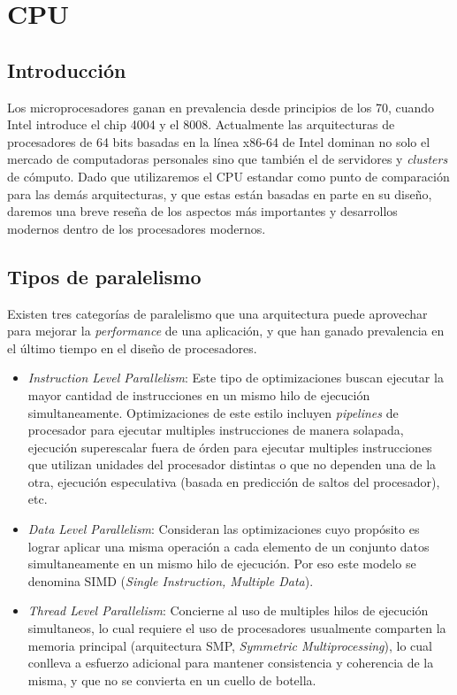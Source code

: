 \section {CPU}

\subsection{Introducci\'on}

Los microprocesadores ganan en prevalencia desde principios de los 70,
cuando Intel introduce el chip 4004 y el 8008. Actualmente las arquitecturas
de procesadores de 64 bits basadas en la l\'inea x86-64 de Intel 
dominan no solo el mercado de computadoras personales sino que tambi\'en el de
servidores y \textit{clusters} de c\'omputo. Dado que utilizaremos el CPU 
estandar como punto de comparaci\'on para las dem\'as arquitecturas, y que estas
est\'an basadas en parte en su dise\~no, daremos una breve rese\~na de los aspectos
m\'as importantes y desarrollos modernos dentro de los procesadores modernos.

\subsection{Tipos de paralelismo}

Existen tres categor\'ias de paralelismo que una arquitectura puede aprovechar 
para mejorar la \textit{performance} de una aplicaci\'on, y que han ganado prevalencia
en el \'ultimo tiempo en el dise\~no de procesadores.

\begin{itemize}
    \item \textit{Instruction Level Parallelism}: Este tipo de optimizaciones buscan
    ejecutar la mayor cantidad de instrucciones en un mismo hilo de ejecuci\'on simultaneamente.
    Optimizaciones de este estilo incluyen
    \textit{pipelines} de procesador para ejecutar multiples instrucciones de manera solapada,
    ejecuci\'on superescalar fuera de \'orden para ejecutar multiples instrucciones que 
    utilizan unidades del procesador distintas o que no dependen una de la otra, ejecuci\'on
    especulativa (basada en predicci\'on de saltos del procesador), etc. 

    \item \textit{Data Level Parallelism}: Consideran las optimizaciones cuyo prop\'osito es
    lograr aplicar una misma operaci\'on a cada elemento de un conjunto datos simultaneamente 
    en un mismo hilo de ejecuci\'on.  Por eso este modelo se denomina SIMD
    (\textit{Single Instruction, Multiple Data}).

    \item \textit{Thread Level Parallelism}: Concierne al uso de multiples hilos de ejecuci\'on
    simultaneos, lo cual requiere el uso de procesadores usualmente
    comparten la memoria principal (arquitectura SMP, \textit{Symmetric Multiprocessing}), lo
    cual conlleva a esfuerzo adicional para mantener consistencia y coherencia de la misma, y
    que no se convierta en un cuello de botella.  
\end{itemize}

